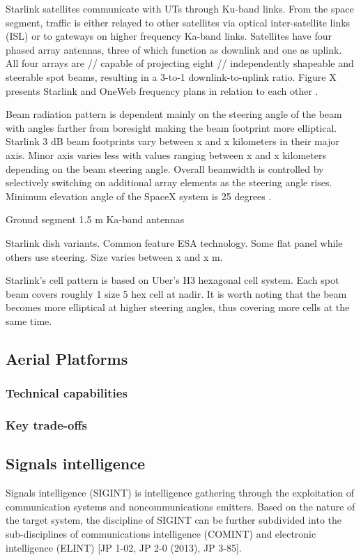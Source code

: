 \documentclass[english, 12pt, a4paper, elec, utf8, a-1b, online]{aaltothesis}
\begin{document}
Starlink satellites communicate with UTs through Ku-band links.
From the space segment, traffic is either relayed to other satellites via optical inter-satellite links (ISL) or to gateways on higher frequency Ka-band links.
Satellites have four phased array antennas, three of which function as downlink and one as uplink.
All four arrays are // capable of projecting eight // independently shapeable and steerable spot beams, resulting in a 3-to-1 downlink-to-uplink ratio.
Figure X presents Starlink and OneWeb frequency plans in relation to each other \cite{spacex2016loa}.

Beam radiation pattern is dependent mainly on the steering angle of the beam with angles farther from boresight making the beam footprint more elliptical.
Starlink 3 dB beam footprints vary between x and x kilometers in their major axis.
Minor axis varies less with values ranging between x and x kilometers depending on the beam steering angle.
Overall beamwidth is controlled by selectively switching on additional array elements as the steering angle rises.
Minimum elevation angle of the SpaceX system is 25 degrees \cite{spacex2016loa, spacex2020mod}.

Ground segment 1.5 m Ka-band antennas

Starlink dish variants. Common feature ESA technology. Some flat panel while others use steering. Size varies between x and x m.

Starlink's cell pattern is based on Uber's H3 hexagonal cell system. Each spot beam covers roughly 1 size 5 hex cell at nadir. It is worth noting that the beam becomes more elliptical at higher steering angles, thus covering more cells at the same time.

\subsection{Aerial Platforms} \label{sect-aerial-platforms}
\subsubsection{Technical capabilities}
\subsubsection{Key trade-offs}

\subsection{Signals intelligence}
Signals intelligence (SIGINT) is intelligence gathering through the exploitation of communication systems and noncommunications emitters.
Based on the nature of the target system, the discipline of SIGINT can be further subdivided into the sub-disciplines of communications intelligence (COMINT) and electronic intelligence (ELINT) \cite{national2015bulk} [JP 1-02, JP 2-0 (2013), JP 3-85].
\end{document}
